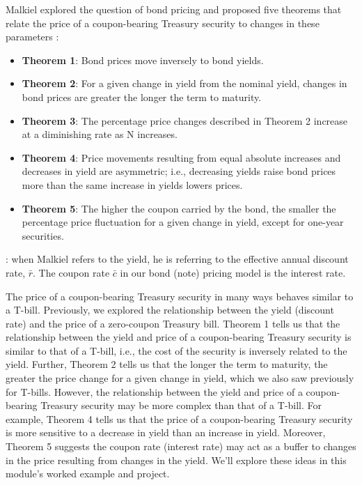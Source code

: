 \documentclass[11pt]{article}
\theoremstyle{definition}
\begin{document}
\begin{concept}\label{concept:malkiel-theorems}
	Malkiel explored the question of bond pricing and proposed five theorems that relate the price of a coupon-bearing Treasury security to changes in these parameters \citep{Malkiel-Bonds-1962}:
\begin{itemize}[leftmargin=*]
\item{\textbf{Theorem 1}: Bond prices move inversely to bond yields.}
\item{\textbf{Theorem 2}: For a given change in yield from the nominal yield, changes in bond prices are greater the longer the term to maturity. }
\item{\textbf{Theorem 3}: The percentage price changes described in Theorem 2 increase at a diminishing rate as N increases. }
\item{\textbf{Theorem 4}: Price movements resulting from equal absolute increases and decreases in yield are asymmetric; i.e., decreasing yields raise bond prices more than the same increase in yields lowers prices. }
\item{\textbf{Theorem 5}: The higher the coupon carried by the bond, the smaller the percentage price fluctuation for a given change in yield, except for one-year securities.}
\end{itemize}
\vspace{0.01in}
: when Malkiel refers to the yield, he is referring to the effective annual discount rate, $\bar{r}$. The coupon rate $\bar{c}$ in our bond (note) pricing model is the interest rate.
\end{concept}


The price of a coupon-bearing Treasury security in many ways behaves similar to a T-bill.
Previously, we explored the relationship between the yield (discount rate) and the price of a zero-coupon Treasury bill. 
Theorem 1 tells us that the relationship between the yield and price of a coupon-bearing Treasury security is similar to that of a T-bill, i.e., the cost of the security is inversely related to the yield.
Further, Theorem 2 tells us that the longer the term to maturity, the greater the price change for a given change in yield, which we also saw previously for T-bills.
However, the relationship between the yield and price of a coupon-bearing Treasury security may be more complex than that of a T-bill. For example, Theorem 4 tells us that the price of a coupon-bearing Treasury security is more sensitive to a decrease in yield than an increase in yield. Moreover, Theorem 5 suggests the coupon rate (interest rate) may act as a buffer to changes in the price resulting from changes in the yield. We'll explore these ideas in this module's worked example and project.
\end{document}
